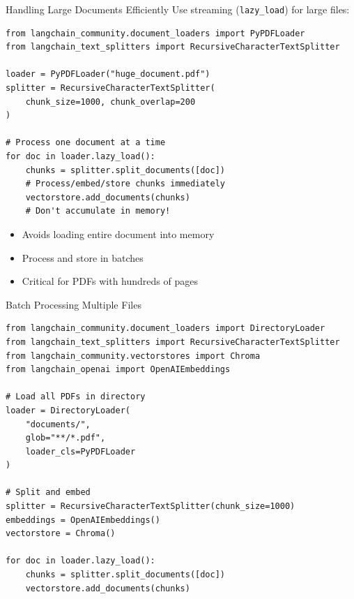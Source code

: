 \documentclass[aspectratio=169,11pt]{beamer}
\begin{document}
\begin{frame}[fragile]{Handling Large Documents Efficiently}
  Use streaming (\texttt{lazy\_load}) for large files:
  \begin{lstlisting}
from langchain_community.document_loaders import PyPDFLoader
from langchain_text_splitters import RecursiveCharacterTextSplitter

loader = PyPDFLoader("huge_document.pdf")
splitter = RecursiveCharacterTextSplitter(
    chunk_size=1000, chunk_overlap=200
)

# Process one document at a time
for doc in loader.lazy_load():
    chunks = splitter.split_documents([doc])
    # Process/embed/store chunks immediately
    vectorstore.add_documents(chunks)
    # Don't accumulate in memory!
  \end{lstlisting}

  \vspace{0.5cm}
  \begin{itemize}
    \setlength{\itemsep}{1pt}
    \item Avoids loading entire document into memory
    \item Process and store in batches
    \item Critical for PDFs with hundreds of pages
  \end{itemize}
\end{frame}

\begin{frame}[fragile]{Batch Processing Multiple Files}
  \begin{lstlisting}
from langchain_community.document_loaders import DirectoryLoader
from langchain_text_splitters import RecursiveCharacterTextSplitter
from langchain_community.vectorstores import Chroma
from langchain_openai import OpenAIEmbeddings

# Load all PDFs in directory
loader = DirectoryLoader(
    "documents/",
    glob="**/*.pdf",
    loader_cls=PyPDFLoader
)

# Split and embed
splitter = RecursiveCharacterTextSplitter(chunk_size=1000)
embeddings = OpenAIEmbeddings()
vectorstore = Chroma()

for doc in loader.lazy_load():
    chunks = splitter.split_documents([doc])
    vectorstore.add_documents(chunks)
  \end{lstlisting}
\end{frame}
\end{document}
